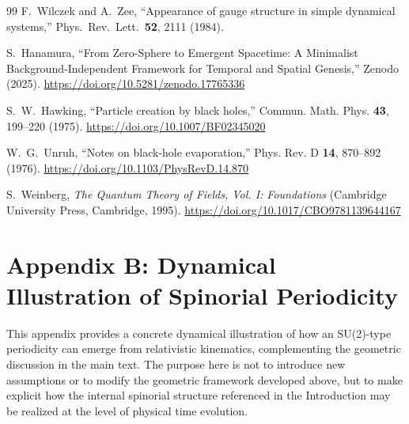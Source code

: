 \documentclass[%
 reprint,
 amsmath,amssymb,
 aps,
 prb,
]{revtex4-2}
\numberwithin{equation}{section}
\begin{document}
\begin{thebibliography}{99}
F.~Wilczek and A.~Zee,
``Appearance of gauge structure in simple dynamical systems,''
Phys.\ Rev.\ Lett.\ {\bf 52}, 2111 (1984).

S.~Hanamura,
``From Zero-Sphere to Emergent Spacetime: A Minimalist Background-Independent Framework for Temporal and Spatial Genesis,''
Zenodo (2025).
\href{https://doi.org/10.5281/zenodo.17765336}{https://doi.org/10.5281/zenodo.17765336}

S.~W.~Hawking,
``Particle creation by black holes,''
Commun. Math. Phys. \textbf{43}, 199--220 (1975).
\href{https://doi.org/10.1007/BF02345020}{https://doi.org/10.1007/BF02345020}

W.~G.~Unruh,
``Notes on black-hole evaporation,''
Phys. Rev. D \textbf{14}, 870--892 (1976).
\href{https://doi.org/10.1103/PhysRevD.14.870}{https://doi.org/10.1103/PhysRevD.14.870}

S.~Weinberg,
\textit{The Quantum Theory of Fields, Vol. I: Foundations}
(Cambridge University Press, Cambridge, 1995).
\href{https://doi.org/10.1017/CBO9781139644167}{https://doi.org/10.1017/CBO9781139644167}

\end{thebibliography}


\appendix
\section{Appendix B: Dynamical Illustration of Spinorial Periodicity}
\label{app:spin_dynamics}

This appendix provides a concrete dynamical illustration of how an SU(2)-type periodicity can emerge from relativistic kinematics, complementing the geometric discussion in the main text. The purpose here is not to introduce new assumptions or to modify the geometric framework developed above, but to make explicit how the internal spinorial structure referenced in the Introduction may be realized at the level of physical time evolution.
\end{document}
